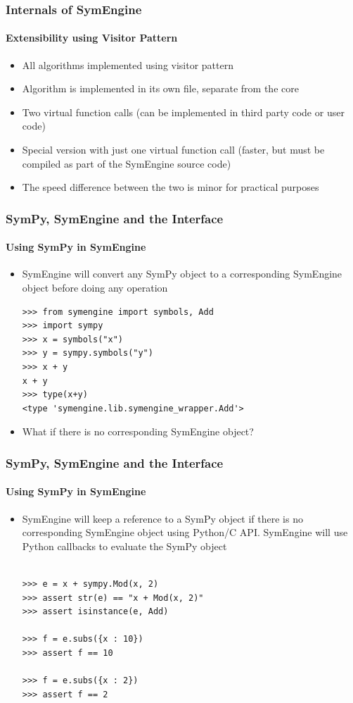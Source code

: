 \documentclass{beamer}
\begin{document}
\begin{frame}
\frametitle{Internals of SymEngine}
\framesubtitle{Extensibility using Visitor Pattern}
\begin{itemize}
    \item All algorithms implemented using visitor pattern
    \item Algorithm is implemented in its own file, separate from the core
    \item Two virtual function calls (can be implemented in third party code or
        user code)
    \item Special version with just one virtual function call (faster, but must
        be compiled as part of the SymEngine source code)
    \item The speed difference between the two is minor for practical purposes
\end{itemize}
\end{frame}


\begin{frame}[fragile]
\frametitle{SymPy, SymEngine and the Interface}
\framesubtitle{Using SymPy in SymEngine}
\begin{itemize}
\item
SymEngine will convert any SymPy object to a corresponding SymEngine object before doing any operation

\begin{verbatim}
>>> from symengine import symbols, Add
>>> import sympy
>>> x = symbols("x")
>>> y = sympy.symbols("y")
>>> x + y
x + y
>>> type(x+y)
<type 'symengine.lib.symengine_wrapper.Add'>
\end{verbatim}
\item
What if there is no corresponding SymEngine object?
\end{itemize}
\end{frame}


\begin{frame}[fragile]
\frametitle{SymPy, SymEngine and the Interface}
\framesubtitle{Using SymPy in SymEngine}
\begin{itemize}
\item
SymEngine will keep a reference to a SymPy object if there is no corresponding SymEngine object using Python/C API.
SymEngine will use Python callbacks to evaluate the SymPy object

\begin{verbatim}

>>> e = x + sympy.Mod(x, 2)
>>> assert str(e) == "x + Mod(x, 2)"
>>> assert isinstance(e, Add)

>>> f = e.subs({x : 10})
>>> assert f == 10

>>> f = e.subs({x : 2})
>>> assert f == 2
\end{verbatim}
\end{itemize}
\end{frame}
\end{document}
